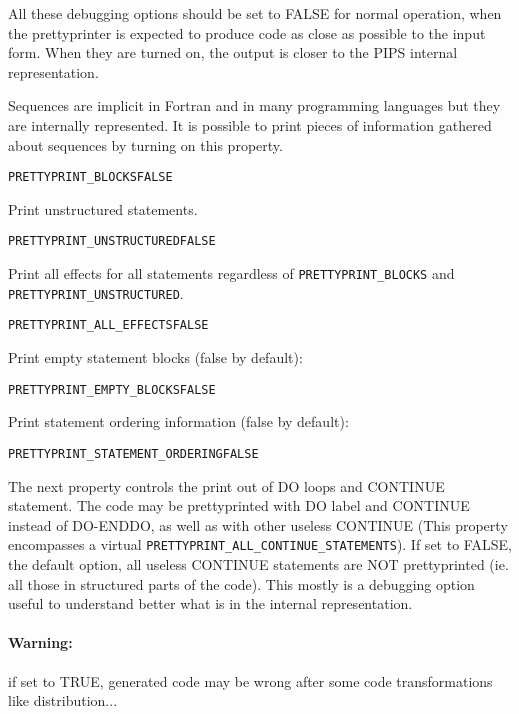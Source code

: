 \documentclass[a4paper]{report}
\newenvironment{PipsProp}{\begin{alltt}}{\end{alltt}}
\begin{document}
All these debugging options should be set to FALSE for normal operation,
when the prettyprinter is expected to produce code as close as possible to
the input form.
When they are turned on, the output is closer to the PIPS internal
representation.

Sequences are implicit in Fortran and in many programming languages but
they are internally represented. It is possible to print pieces of
information  gathered about sequences by turning on this property.

\begin{PipsProp}
PRETTYPRINT_BLOCKS FALSE
\end{PipsProp}

Print unstructured statements.

\begin{PipsProp}
PRETTYPRINT_UNSTRUCTURED FALSE
\end{PipsProp}

Print all effects for all statements regardless of \verb+PRETTYPRINT_BLOCKS+
and \verb+PRETTYPRINT_UNSTRUCTURED+.

\begin{PipsProp}
PRETTYPRINT_ALL_EFFECTS FALSE
\end{PipsProp}

Print empty statement blocks (false by default):

\begin{PipsProp}
PRETTYPRINT_EMPTY_BLOCKS FALSE
\end{PipsProp}

Print statement ordering information (false by default):

\begin{PipsProp}
PRETTYPRINT_STATEMENT_ORDERING FALSE
\end{PipsProp}

The next property controls the print out of DO loops and CONTINUE
statement. The code may be prettyprinted with DO label and CONTINUE
instead of DO-ENDDO, as well as with other useless CONTINUE (This property
encompasses a virtual \verb/PRETTYPRINT_ALL_CONTINUE_STATEMENTS/). If set
to FALSE, the default option, all useless CONTINUE statements are NOT
prettyprinted (ie. all those in structured parts of the code). This mostly
is a debugging option useful to understand better what is in the internal
representation.

\paragraph{Warning:} if set to TRUE, generated code may be
wrong after some code transformations like distribution...
\end{document}
